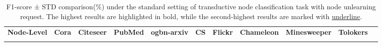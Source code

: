 \begin{table}[ht]
\caption{F1-score ± STD comparison(\%) under the standard setting of transductive node classification task with node unlearning request. The highest results are highlighted in \colorbox{mycyan!40}{bold}, while the second-highest results are marked with \colorbox{myblue!20}{\underline{underline}}.}%
\centering%

\renewcommand{\arraystretch}{1.2} %
\begin{tabular*}{0.99\textwidth}{lcccccccccc}%
\arrayrulecolor{myblue5}\toprule[0.16em]%
\textbf{Node-Level} &\textbf{Cora}&\textbf{Citeseer} & \textbf{PubMed}&\textbf{ogbn-arxiv} &\textbf{CS}& \textbf{Flickr}&\textbf{Chameleon} &\textbf{Minesweeper} & \textbf{Tolokers}\\ \arrayrulecolor{under}\midrule[0.1em]%


\end{tabular*}
\end{table}
